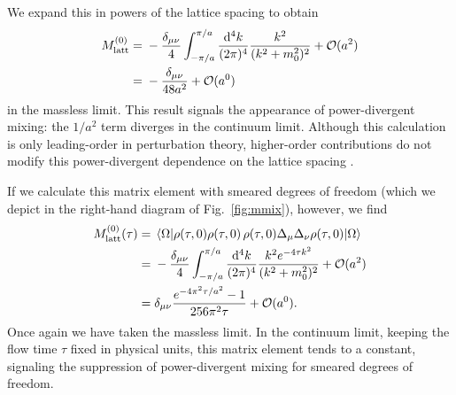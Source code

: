 We expand this in powers of the lattice spacing to obtain
\begin{align}
M^{(0)}_{\mathrm{latt}} = {} & -\frac{\delta_{\mu\nu}}{4}
\int^{\pi/a}_{-\pi/a}\frac{\mathrm{d}^4k}{(2\pi)^4}
\frac{k^2}{(k^2+m_0^2)^2 } +{\cal O}(a^2) \nonumber\\
= {} & 
-\frac{\delta_{\mu\nu}}{48a^2}+{\cal 
O}(a^0)
\end{align}
in the massless limit. This result signals the appearance of power-divergent 
mixing: the $1/a^2$ term diverges in the continuum limit. Although this 
calculation is only leading-order in perturbation theory, higher-order 
contributions do not modify this power-divergent dependence on the lattice 
spacing \cite{Davoudi:2012ya}.

If we calculate this matrix element with smeared degrees of freedom 
(which we depict in the right-hand 
diagram of Fig.~\ref{fig:mmix}), however, we find
\begin{align}
M^{(0)}_{\mathrm{latt}}(\tau) = {} &\left\langle \Omega | \rho(\tau,0) 
\rho(\tau,0) \,\rho(\tau,0) 
\Delta_\mu\Delta_\nu \rho(\tau,0) |\Omega \right\rangle \nonumber\\ 
= {} &  -\frac{\delta_{\mu\nu}}{4}
\int^{\pi/a}_{-\pi/a}\frac{\mathrm{d}^4k}{(2\pi)^4}
\frac{k^2e^{-4\tau k^2}}{(k^2+m_0^2)^2 } +{\cal O}(a^2) \nonumber\\
= {} & \delta_{\mu\nu}
\frac{e^{-4\pi^2\tau/a^2}-1}{256\pi^2\tau}+{\cal 
O}(a^0).
\end{align}
Once again we have taken the massless limit. In the continuum limit, 
keeping the flow time $\tau$ fixed in physical units, this matrix element 
tends to a constant, signaling the suppression of power-divergent mixing for 
smeared degrees of freedom.
